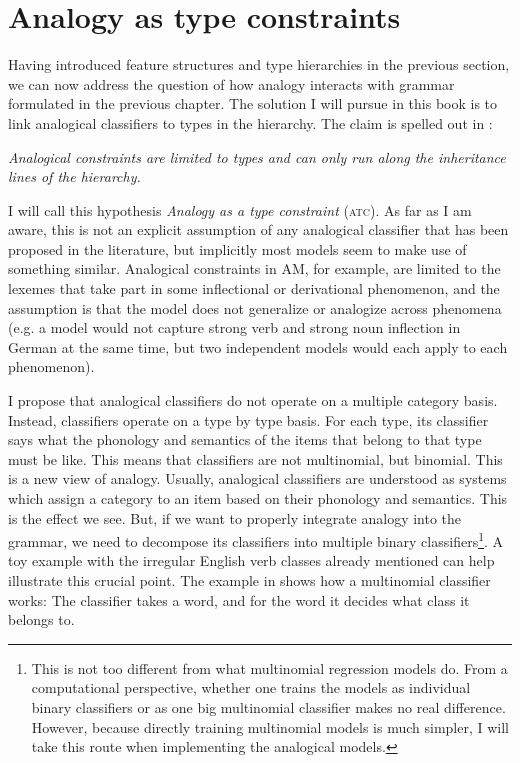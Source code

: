 \section{Analogy as type constraints}


Having introduced feature structures and type hierarchies in the previous section, we can now address the question of how analogy interacts with grammar formulated in the previous chapter. The solution I will pursue in this book is to link analogical classifiers to types in the hierarchy. The claim is spelled out in :

\begin{exe}
    \ex \label{claim-book} \emph{Analogical constraints are limited to types and can only run along the inheritance lines of the hierarchy.}
\end{exe}

I will call this hypothesis \emph{Analogy as a type constraint} (\textsc{atc}). As far as I am aware, this is not an explicit assumption of any analogical classifier that has been proposed in the literature, but implicitly most models seem to make use of something similar. Analogical constraints in AM, for example, are limited to the lexemes that take part in some inflectional or derivational phenomenon, and the assumption is that the model does not generalize or analogize across phenomena (e.g. a model would not capture strong verb and strong noun inflection in German at the same time, but two independent models would each apply to each phenomenon).

I propose that analogical classifiers do not operate on a multiple category basis. Instead, classifiers operate on a type by type basis. For each type, its classifier says what the phonology and semantics of the items that belong to that type must be like. This means that classifiers are not multinomial, but binomial. This is a new view of analogy. Usually, analogical classifiers are understood as systems which assign a category to an item based on their phonology and semantics. This is the effect we see. But, if we want to properly integrate analogy into the grammar, we need to decompose its classifiers into multiple binary classifiers\footnote{This is not too different from what multinomial regression models do. From a computational perspective, whether one trains the models as individual binary classifiers or as one big multinomial classifier makes no real difference. However, because directly training multinomial models is much simpler, I will take this route when implementing the analogical models.}. A toy example with the irregular English verb classes already mentioned can help illustrate this crucial point. The example in  shows how a multinomial classifier works: The classifier takes a word, and for the word it decides what class it belongs to.


